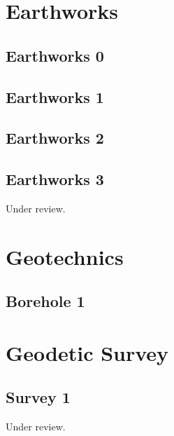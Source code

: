\documentclass{scrartcl}
\begin{document}
\section{Earthworks}

\subsection{Earthworks 0}
\label{sec:earth_0}
\clearpage

\subsection{Earthworks 1}
\label{sec:earth_1}
\clearpage

\subsection{Earthworks 2}
\label{sec:earth_2}
\clearpage

\subsection{Earthworks 3}
\label{sec:earth_3}
Under review.%
\clearpage

\section{Geotechnics}

\subsection{Borehole 1}
\label{sec:borehole_1}
\clearpage

\section{Geodetic Survey}

\subsection{Survey 1}
\label{sec:survey_1}
Under review.%
\clearpage
\end{document}
